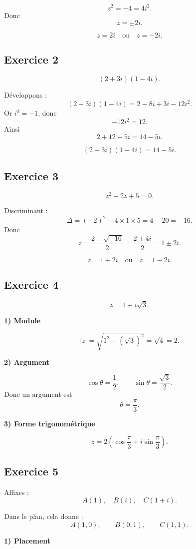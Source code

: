 \documentclass[11pt,a4paper]{article}
\begin{document}
\[
z^2=-4=4i^2.
\]
Donc
\[
z=\pm 2i.
\]

\[
\boxed{z=2i \quad \text{ou} \quad z=-2i.}
\]

\subsection*{Exercice 2}
\[
(2+3i)(1-4i).
\]

Développons :
\[
(2+3i)(1-4i)=2-8i+3i-12i^2.
\]
Or \(i^2=-1\), donc
\[
-12i^2=12.
\]
Ainsi
\[
2+12-5i=14-5i.
\]

\[
\boxed{(2+3i)(1-4i)=14-5i.}
\]

\subsection*{Exercice 3}
\[
z^2-2z+5=0.
\]

Discriminant :
\[
\Delta=(-2)^2-4\times 1\times 5=4-20=-16.
\]
Donc
\[
z=\frac{2\pm \sqrt{-16}}{2}=\frac{2\pm 4i}{2}=1\pm 2i.
\]

\[
\boxed{z=1+2i \quad \text{ou} \quad z=1-2i.}
\]

\subsection*{Exercice 4}
\[
z=1+i\sqrt3.
\]

\textbf{1) Module}

\[
|z|=\sqrt{1^2+(\sqrt3)^2}=\sqrt{4}=2.
\]

\textbf{2) Argument}

\[
\cos \theta=\frac12,\qquad \sin\theta=\frac{\sqrt3}{2}.
\]
Donc un argument est
\[
\theta=\frac{\pi}{3}.
\]

\textbf{3) Forme trigonométrique}

\[
\boxed{z=2\left(\cos\frac{\pi}{3}+i\sin\frac{\pi}{3}\right).}
\]

\subsection*{Exercice 5}
Affixes :
\[
A(1),\quad B(i),\quad C(1+i).
\]

Dans le plan, cela donne :
\[
A(1,0),\qquad B(0,1),\qquad C(1,1).
\]

\textbf{1) Placement}
\end{document}
